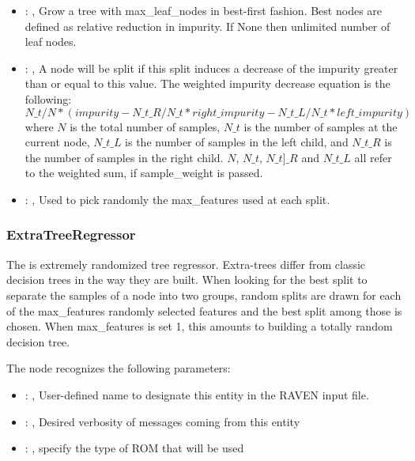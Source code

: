 \begin{itemize}
    \item {}: , 
      Grow a tree with max\_leaf\_nodes in best-first fashion. Best nodes are defined as relative
      reduction                                                  in impurity. If None then unlimited
      number of leaf nodes.

    \item {}: , 
      A node will be split if this split induces a decrease of the impurity greater than or equal to
      this value.                                                  The weighted impurity decrease
      equation is the following:                                                  $N\_t / N *
      (impurity - N\_t\_R / N\_t * right\_impurity - N\_t\_L / N\_t * left\_impurity)$
      where $N$ is the total number of samples, $N\_t$ is the number of samples at the current node,
      $N\_t\_L$ is the number                                                  of samples in the
      left child, and $N\_t\_R$ is the number of samples in the right child.
      $N$, $N\_t$, $N\_t]\_R$ and $N\_t\_L$ all refer to the weighted sum, if sample\_weight is
      passed.

    \item {}: , 
      Used to pick randomly the max\_features used at each split.
  \end{itemize}


\subsubsection{ExtraTreeRegressor}
  The  is extremely randomized tree regressor.
  Extra-trees differ from classic decision trees in the way they are built. When
  looking for the best split to separate the samples of a node into two groups,
  random splits are drawn for each of the max\_features randomly selected features
  and the best split among those is chosen. When max\_features is set 1, this amounts
  to building a totally random decision tree.

  The  node recognizes the following parameters:
    \begin{itemize}
      \item {}: , 
        User-defined name to designate this entity in the RAVEN input file.
      \item {}: , 
        Desired verbosity of messages coming from this entity
      \item {}: , 
        specify the type of ROM that will be used
  \end{itemize}


